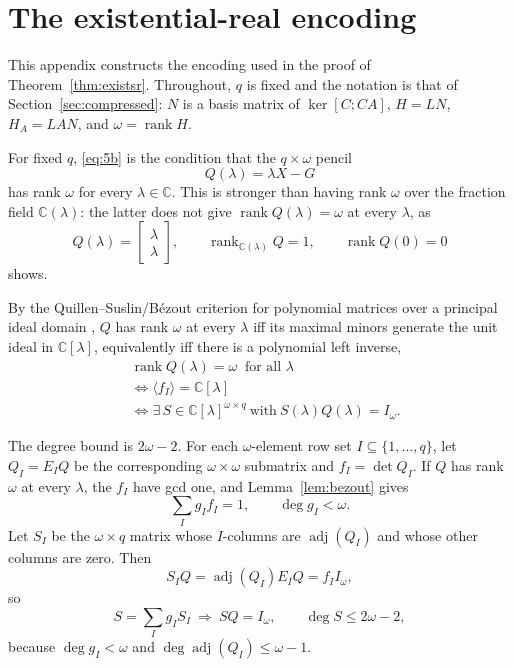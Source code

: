 \documentclass[journal]{IEEEtran}
\theoremstyle{plainn}
\theoremstyle{remark}
\begin{document}
\appendices
\section{The existential-real encoding}\label{app:encoding}

This appendix constructs the encoding used in the proof of Theorem~\ref{thm:existsr}. Throughout, $q$ is fixed and the notation is that of Section~\ref{sec:compressed}: $N$ is a basis matrix of $\ker[C;CA]$, $H=LN$, $H_A=LAN$, and $\omega=\operatorname{rank}H$.

For fixed $q$, \eqref{eq:5b} is the condition that the $q\times\omega$ pencil
\begin{equation}
Q(\lambda)=\lambda X-G
\end{equation}
has rank $\omega$ for every $\lambda\in\mathbb C$. This is stronger than having rank $\omega$ over the fraction field $\mathbb C(\lambda)$: the latter does not give $\operatorname{rank}Q(\lambda)=\omega$ at every $\lambda$, as
\begin{equation*}
Q(\lambda)=\begin{bmatrix}\lambda\\ \lambda\end{bmatrix},\qquad
\operatorname{rank}_{\mathbb C(\lambda)}Q=1,\qquad \operatorname{rank}Q(0)=0
\end{equation*}
shows.

By the Quillen--Suslin/B\'ezout criterion for polynomial matrices over a principal ideal
domain \cite{fab90,lan02}, $Q$ has rank $\omega$ at every $\lambda$ iff its maximal minors generate the unit ideal in $\mathbb C[\lambda]$, equivalently iff there is a polynomial left inverse,
\begin{equation*}
\begin{aligned}
&\operatorname{rank}Q(\lambda)=\omega\ \text{ for all }\lambda\\
&\iff\langle f_I\rangle=\mathbb C[\lambda]\\
&\iff\exists\,S\in\mathbb C[\lambda]^{\omega\times q}\ \text{with}\ S(\lambda)Q(\lambda)=I_\omega .
\end{aligned}
\end{equation*}

The degree bound is $2\omega-2$. For each $\omega$-element row set $I\subseteq\{1,\dots,q\}$, let $Q_I=E_IQ$ be the corresponding $\omega\times\omega$ submatrix and $f_I=\det Q_I$. If $Q$ has rank $\omega$ at every $\lambda$, the $f_I$ have gcd one, and Lemma~\ref{lem:bezout} gives
\begin{equation}
\sum_I g_I f_I=1,\qquad \deg g_I<\omega .
\end{equation}
Let $S_I$ be the $\omega\times q$ matrix whose $I$-columns are $\operatorname{adj}(Q_I)$ and whose other columns are zero. Then
\begin{equation*}
S_IQ=\operatorname{adj}(Q_I)E_IQ=f_II_\omega,
\end{equation*}
so
\begin{equation*}
S=\sum_I g_I S_I\ \Longrightarrow\ SQ=I_\omega,\qquad
\deg S\le2\omega-2,
\end{equation*}
because $\deg g_I<\omega$ and $\deg\operatorname{adj}(Q_I)\le\omega-1$.
\end{document}
